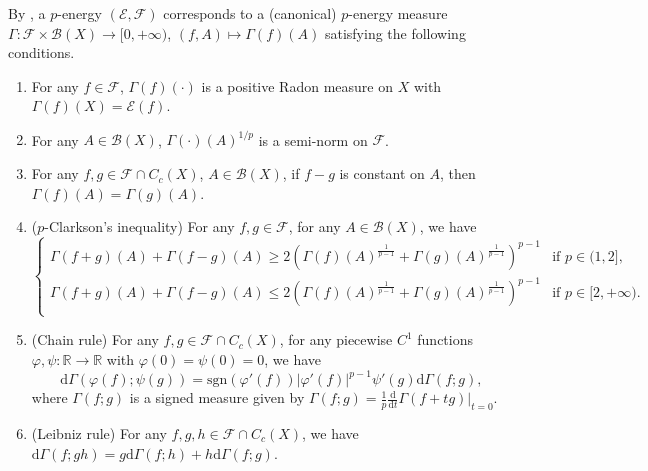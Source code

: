 \documentclass[10pt,a4paper]{amsart}
\numberwithin{equation}{section}
\begin{document}
By \cite[Theorem 2.4]{Sas26}, a $p$-energy $(\mathcal{E},\mathcal{F})$ corresponds to a (canonical) $p$-energy measure $\Gamma:\mathcal{F}\times\mathcal{B}(X)\to[0,+\infty)$, $(f,A)\mapsto\Gamma(f)(A)$ satisfying the following conditions.
\begin{enumerate}[label=(\alph*),ref=(\alph*)]
\item\label{item_meas1} For any $f\in\mathcal{F}$, $\Gamma(f)(\cdot)$ is a positive Radon measure on $X$ with $\Gamma(f)(X)=\mathcal{E}(f)$.
\item\label{item_meas2} For any $A\in\mathcal{B}(X)$, $\Gamma(\cdot)(A)^{1/p}$ is a semi-norm on $\mathcal{F}$.
\item\label{item_meas3} For any $f,g\in\mathcal{F}\cap C_c(X)$, $A\in\mathcal{B}(X)$, if $f-g$ is constant on $A$, then $\Gamma(f)(A)=\Gamma(g)(A)$.
\item\label{item_meas4} ($p$-Clarkson's inequality) For any $f,g\in\mathcal{F}$, for any $A\in\mathcal{B}(X)$, we have
\begin{equation*}
\begin{cases}
\Gamma(f+g)(A)+\Gamma(f-g)(A)\ge2 \left(\Gamma(f)(A)^{\frac{1}{p-1}}+\Gamma(g)(A)^{\frac{1}{p-1}}\right)^{p-1}&\text{if }p\in(1,2],\\
\Gamma(f+g)(A)+\Gamma(f-g)(A)\le2 \left(\Gamma(f)(A)^{\frac{1}{p-1}}+\Gamma(g)(A)^{\frac{1}{p-1}}\right)^{p-1}&\text{if }p\in[2,+\infty).\\
\end{cases}
\end{equation*}
\item\label{item_meas5} (Chain rule) For any $f,g\in\mathcal{F}\cap C_c(X)$, for any piecewise $C^1$ functions $\varphi,\psi:\mathbb{R}\to\mathbb{R}$ with $\varphi(0)=\psi(0)=0$, we have
$$\mathrm{d}\Gamma\left(\varphi(f);\psi(g)\right)=\mathrm{sgn}(\varphi'(f))|\varphi'(f)|^{p-1}\psi'(g)\mathrm{d}\Gamma(f;g),$$
where $\Gamma(f;g)$ is a signed measure given by $\Gamma(f;g)=\frac{1}{p}\frac{\mathrm{d}}{\mathrm{d}t}\Gamma(f+tg)|_{t=0}$.
\item\label{item_meas6} (Leibniz rule) For any $f,g,h\in \mathcal{F}\cap C_c(X)$, we have $\mathrm{d}\Gamma(f;gh)=g \mathrm{d}\Gamma(f;h)+h \mathrm{d}\Gamma(f;g)$.
\end{enumerate}
\end{document}
